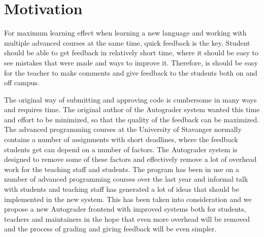 \chapter{Motivation}
For maximum learning effect when learning a new language and working with multiple advanced courses at the same time, quick feedback is the key. Student should be able to get feedback in relatively short time, where it should be easy to see mistakes that were made and ways to improve it. Therefore, is should be easy for the teacher to make comments and give feedback to the students both on and off campus.

The original way of submitting and approving code is cumbersome in many ways and requires time. The original author of the Autograder system wanted this time and effort to be minimized, so that the quality of the feedback can be maximized. The advanced programming courses at the University of Stavanger normally contains a number of assignments with short deadlines, where the feedback students get can depend on a number of factors. The Autograder system is designed to remove some of these factors and effectively remove a lot of overhead work for the teaching staff and students. The program has been in use on a number of advanced programming courses over the last year and informal talk with students and teaching staff has generated a lot of ideas that should be implemented in the new system. This has been taken into consideration and we propose a new Autograder frontend with improved systems both for students, teachers and maintainers in the hope that even more overhead will be removed and the process of grading and giving feedback will be even simpler.

